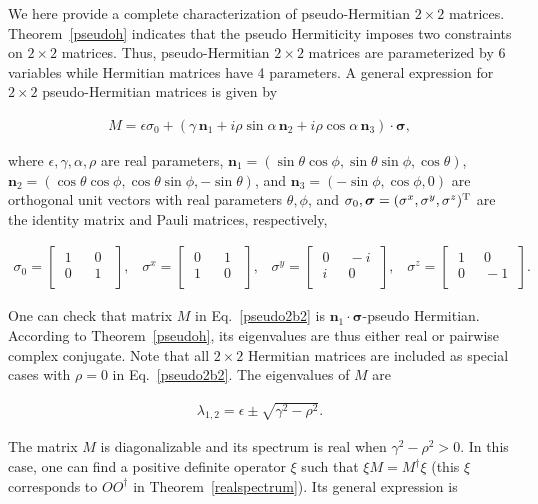 \documentclass{tADP2e}
\theoremstyle{plain}
\newcommand{\eqn}[1]{
\begin{eqnarray}
	#1
\end{eqnarray}
}
\theoremstyle{plain}
\theoremstyle{definition}
\begin{document}
{We here provide a complete characterization of pseudo-Hermitian $2\times 2$ matrices.  Theorem~\ref{pseudoh} indicates that the pseudo Hermiticity imposes two constraints on $2\times 2$ matrices. Thus, pseudo-Hermitian $2\times 2$ matrices are parameterized by 6 variables while Hermitian matrices have 4 parameters. A general expression for $2\times 2$ pseudo-Hermitian matrices is  given by \cite{WCT10}
\eqn{\label{pseudo2b2}
M=\epsilon\sigma_0+(\gamma\,{\boldsymbol n}_{1}+i\rho\sin\alpha\,{\boldsymbol n}_2+i\rho\cos\alpha\,{\boldsymbol n}_3)\cdot{\boldsymbol \sigma},
}
where $\epsilon,\gamma,\alpha,\rho$ are real parameters, ${\boldsymbol n}_1=(\sin\theta\cos\phi,\sin\theta\sin\phi,\cos\theta)$, ${\boldsymbol n}_2=(\cos\theta\cos\phi,\cos\theta\sin\phi,-\sin\theta)$, and ${\boldsymbol n}_3=(-\sin\phi,\cos\phi,0)$ are orthogonal unit vectors with real parameters $\theta,\phi$, and $\sigma_0,{\boldsymbol \sigma}=(\sigma^x,\sigma^y,\sigma^z)^{\rm T}$ are the identity matrix and Pauli matrices, respectively,
\eqn{
\sigma_0=
\begin{bmatrix}
\;1\;&\;\;0\;\;\\
\;0\;&\;\;1\;\;\\
\end{bmatrix},\;\;\;
\sigma^x=
\begin{bmatrix}
\;0\;&\;\;1\;\;\\
\;1\;&\;\;0\;\;\\
\end{bmatrix},\;\;\;
\sigma^y=
\begin{bmatrix}
\;0\;&\;-i\;\\
\;i\;&\;0\;\\
\end{bmatrix},\;\;\;
\sigma^z=
\begin{bmatrix}
\;1\;&\;0\;\\
\;0\;&\;-1\;\\
\end{bmatrix}.
}
One can check that matrix $M$ in Eq.~\eqref{pseudo2b2} is ${\boldsymbol n}_1\cdot{\boldsymbol \sigma}$-pseudo Hermitian. According to Theorem~\ref{pseudoh},  its eigenvalues are thus either real or pairwise complex conjugate. Note that all $2\times 2$ Hermitian matrices are included as special cases with $\rho=0$ in Eq.~\eqref{pseudo2b2}. The eigenvalues of $M$ are
\eqn{
\lambda_{1,2}=\epsilon\pm\sqrt{\gamma^2-\rho^2}.
}
The matrix $M$ is diagonalizable and its spectrum is real when $\gamma^2-\rho^2>0$. In this case, one can find a positive definite operator $\xi$ such that $\xi M=M^{\dagger}\xi$ (this $\xi$ corresponds to $OO^\dagger$ in  Theorem~\ref{realspectrum}). Its general expression is
}
\end{document}
